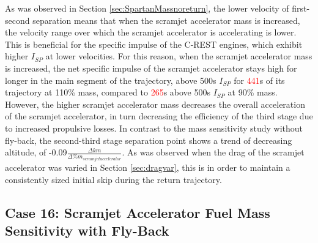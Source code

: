  As was observed in Section \ref{sec:SpartanMassnoreturn}, the lower velocity of first-second separation means that when the scramjet accelerator mass is increased, the velocity range over which the scramjet accelerator is accelerating is lower. This is beneficial for the specific impulse of the C-REST engines, which exhibit higher $I_{SP}$ at lower velocities. For this reason, when the scramjet accelerator mass is increased, the net specific impulse of the scramjet accelerator stays high for longer in the main segment of the trajectory, above 500s $I_{SP}$ for \textcolor{red}{441}s of its trajectory at 110\% mass, compared to \textcolor{red}{265}s above 500s $I_{SP}$ at 90\% mass. 
However, the higher scramjet accelerator mass decreases the overall acceleration of the scramjet accelerator, in turn decreasing the efficiency of the third stage due to increased propulsive losses.
In contrast to the mass sensitivity study without fly-back, the second-third stage separation point shows a trend of decreasing altitude, of -0.09$\frac{\Delta km}{\Delta\% m_{scramjet accelerator}}$. As was observed when the drag of the scramjet accelerator was varied in Section \ref{sec:dragvar}, this is in order to maintain a consistently sized initial skip during the return trajectory.


\subsection{Case 16: Scramjet Accelerator Fuel Mass Sensitivity with Fly-Back}

